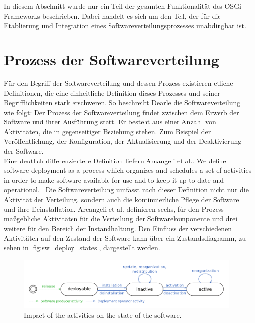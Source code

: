 In diesem Abschnitt wurde nur ein Teil der gesamten Funktionalität des \ac{OSGi}-Frame\-works beschrieben.
Dabei handelt es sich um den Teil, der für die Etablierung und Integration eines Softwareverteilungsprozesses unabdingbar ist.


\section{Prozess der Softwareverteilung}
\label{prozess_der_softwareverteilung}
Für den Begriff der Softwareverteilung und dessen Prozess existieren etliche Definitionen, die eine einheitliche Definition
dieses Prozesses und seiner Begrifflichkeiten stark erschweren. 
So beschreibt Dearle \cite{sw_dist_dearle} die Softwareverteilung wie folgt:
Der Prozess der Softwareverteilung findet zwischen dem Erwerb der Software und ihrer Ausführung statt.
Er besteht aus einer Anzahl von Aktivitäten, die in gegenseitiger Beziehung stehen.
Zum Beispiel der Veröffentlichung, der Konfiguration, der Aktualisierung und der Deaktivierung der Software.\\

Eine deutlich differenziertere Definition liefern Arcangeli et al.: 
\glqq We define software deployment as a process which organizes and schedules a set of activities in order
to make software available for use and to keep it up-to-date and operational.\grqq\ \cite{sw_dist}
Die Softwareverteilung umfasst nach dieser Definition nicht nur die Aktivität der Verteilung, sondern auch die 
kontinuierliche Pflege der Software und ihre Deinstallation.
Arcangeli et al. \cite{sw_dist} definieren sechs, für den Prozess maßgebliche Aktivitäten für die Verteilung der Softwarekomponente und drei weitere für den 
Bereich der Instandhaltung.
Den Einfluss der verschiedenen Aktivitäten auf den Zustand der Software kann über ein Zustandsdiagramm, zu sehen in \autoref{fig:sw_deploy_states}, dargestellt werden. \\

\begin{figure}[h]
 \centering
 \includegraphics[width=11cm]{content/pictures/sw_deploy_states.png}
 \caption{Impact of the activities on the state of the software. \cite{sw_dist}}
 \label{fig:sw_deploy_states}
\end{figure}

